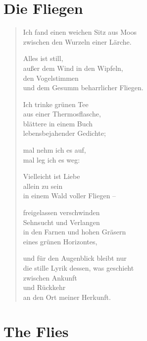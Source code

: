 
\cleartoverso

\section{Die Fliegen}

\begin{verse}
Ich fand einen weichen Sitz aus Moos\\
zwischen den Wurzeln einer Lärche.

Alles ist still,\\
außer dem Wind in den Wipfeln,\\
den Vogelstimmen\\
und dem Gesumm beharrlicher Fliegen.

Ich trinke grünen Tee\\
aus einer Thermosflasche,\\
blättere in einem Buch\\
lebensbejahender Gedichte;

mal nehm ich es auf,\\
mal leg ich es weg:

Vielleicht ist Liebe\\
allein zu sein\\
in einem Wald voller Fliegen --

freigelassen verschwinden\\
Sehnsucht und Verlangen\\
in den Farnen und hohen Gräsern\\
eines grünen Horizontes,

\clearpage

und für den Augenblick bleibt nur\\
die stille Lyrik dessen, was geschieht\\
zwischen Ankunft\\
und Rückkehr\\
an den Ort meiner Herkunft.

\end{verse}

\clearpage

\section{The Flies}

